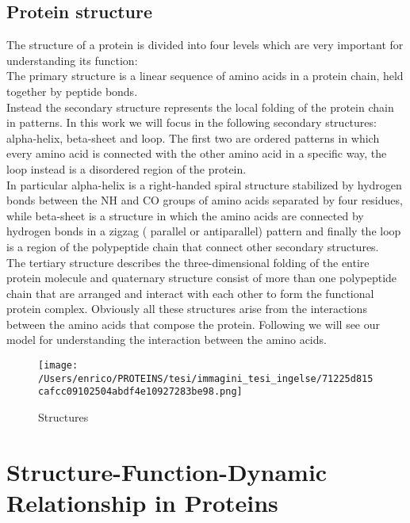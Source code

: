\documentclass[English, Lau, oneside]{sapthesis}
\begin{document}
\section{Protein structure}
\noindent 
The structure of a protein is divided into four levels which are very important for understanding its function:\cite{ref4}\\
The primary structure is a linear sequence of amino acids in a protein chain, held together by peptide bonds.\\ 
Instead the secondary structure represents the local folding of the protein chain in patterns.
In this work we will focus in the following secondary structures: alpha-helix, beta-sheet and loop. The first two are ordered patterns in which every amino acid is connected with the other amino acid in a specific way, the loop instead is a disordered region of the protein.\\
In particular alpha-helix is a right-handed spiral structure stabilized by hydrogen bonds between the NH and CO groups of amino acids separated by four residues, while beta-sheet is a structure in which the amino acids are connected by hydrogen bonds in a zigzag ( parallel or antiparallel) pattern
and finally the loop is a region of the polypeptide chain that connect other secondary structures.\\
The tertiary structure describes the three-dimensional folding of the entire protein molecule 
and quaternary structure consist of more than one polypeptide chain that are arranged and interact with each other to form the functional protein complex.
Obviously all these structures arise from the interactions between the amino acids that compose the protein. 
Following we will see our model for understanding the interaction between the amino acids.

\begin{figure}[H]
    \centering
    \texttt{[image: /Users/enrico/PROTEINS/tesi/immagini\_tesi\_ingelse/71225d815cafcc09102504abdf4e10927283be98.png]}
    \caption{Structures}
\end{figure}



\newpage

\chapter{Structure-Function-Dynamic Relationship in Proteins}
\end{document}
